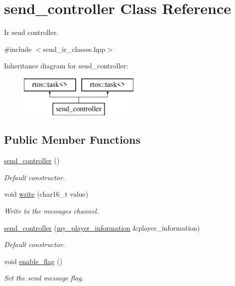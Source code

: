 \hypertarget{classsend__controller}{}\section{send\+\_\+controller Class Reference}
\label{classsend__controller}


Ir send controller.  




{\ttfamily \#include $<$send\+\_\+ir\+\_\+classes.\+hpp$>$}

Inheritance diagram for send\+\_\+controller\+:\begin{figure}[H]
\begin{center}
\leavevmode
\includegraphics[height=2.000000cm]{classsend__controller}
\end{center}
\end{figure}
\subsection*{Public Member Functions}
\begin{DoxyCompactItemize}
\item 
\hyperlink{classsend__controller_a31abdb529dba4bde0893bf04d0ef113d}{send\+\_\+controller} ()
\begin{DoxyCompactList}\small\item\em Default constructor. \end{DoxyCompactList}\item 
void \hyperlink{classsend__controller_ada7d206636bf7b867696cfa8fdd080b2}{write} (char16\+\_\+t value)
\begin{DoxyCompactList}\small\item\em Write to the messages channel. \end{DoxyCompactList}\item 
\hyperlink{classsend__controller_a4f7f3b8afe7b94c3b6f284ad31fb4492}{send\+\_\+controller} (\hyperlink{classmy__player__information}{my\+\_\+player\+\_\+information} \&player\+\_\+information)
\begin{DoxyCompactList}\small\item\em Default constructor. \end{DoxyCompactList}\item 
void \hyperlink{classsend__controller_a29cfa70656efe2e26bc2c7cebe84ee46}{enable\+\_\+flag} ()
\begin{DoxyCompactList}\small\item\em Set the send message flag. \end{DoxyCompactList}\end{DoxyCompactItemize}


